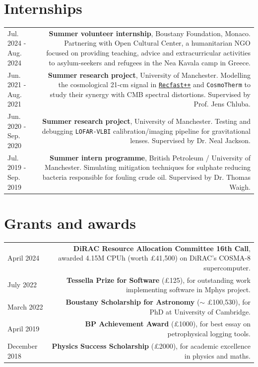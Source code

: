 \documentclass{article}
\begin{document}
\section*{Internships}

\begin{longtable}{L!{\vrule}R}
    
    Jul. 2024 - Aug. 2024 & \textbf{Summer volunteer internship}, Boustany Foundation, Monaco. Partnering with Open Cultural Center, a humanitarian NGO focused on providing teaching, advice and extracurricular activities to asylum-seekers and refugees in the Nea Kavala camp in Greece.  \\
    
    Jun. 2021 - Aug. 2021 & \textbf{Summer research project}, University of Manchester. Modelling the cosmological 21-cm signal in \href{https://bitbucket.org/Jacetoto/recfast-.vx/src/Recfast_JD_21cm_modelling/}{\texttt{Recfast++}} and \texttt{CosmoTherm} to study their synergy with CMB spectral distortions. Supervised by Prof. Jens Chluba. \\
    
    Jun. 2020 - Sep. 2020 & \textbf{Summer research project}, University of Manchester. Testing and debugging \texttt{LOFAR-VLBI} calibration/imaging pipeline for gravitational lenses. Supervised by Dr. Neal Jackson.\\
    
    Jul. 2019 - Sep. 2019 & \textbf{Summer intern programme}, British Petroleum / University of Manchester. Simulating mitigation techniques for sulphate reducing bacteria responsible for fouling crude oil. Supervised by Dr. Thomas Waigh. \\

  \end{longtable}

\section*{Grants and awards}

\begin{longtable}{L!{\vrule}R}

    April 2024 & \textbf{DiRAC Resource Allocation Committee 16th Call}, awarded 4.15M CPUh (worth £41,500) on DiRAC's COSMA-8 supercomputer. \\
    
    July 2022 & \textbf{Tessella Prize for Software} (£125), for outstanding work implementing software in Mphys project. \\
    
    March 2022 & \textbf{Boustany Scholarship for Astronomy} ($\sim$ £100,530), for PhD at University of Cambridge. \\
    
    April 2019 & \textbf{BP Achievement Award} (£1000), for best essay on petrophysical logging tools. \\
    
    December 2018 & \textbf{Physics Success Scholarship} (£2000), for academic excellence in physics and maths.\\

\end{longtable}
\end{document}
